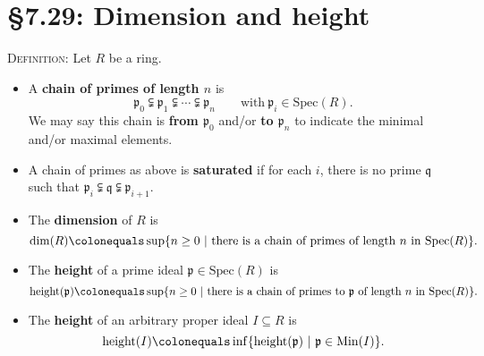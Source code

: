 \documentclass[12pt]{amsart}
\newcommand{\p}{\mathfrak{p}}
\newcommand{\q}{\mathfrak{q}}
\newcommand{\hgt}{\mathrm{height}}
\newcommand{\Min}{\mathrm{Min}}
\newcommand{\Spec}{\mathrm{Spec}}
\renewcommand{\1}{\mathbbm{1}}
\newcommand{\showsol}[1]{\def\displaysol{#1}}
\newcommand\ceq{\colonequals}
\begin{document}
\showsol{0}
	
	\thispagestyle{empty}
	
	\section*{\S7.29: Dimension and height}
	
	\begin{framed}

\noindent \textsc{Definition:} Let $R$ be a ring. 
\begin{itemize}
\item A \textbf{chain of primes of length $n$} is
\[ \p_0 \subsetneqq \p_1 \subsetneqq \cdots \subsetneqq \p_n \qquad \text{with} \ \p_i\in \Spec(R).\]
We may say this chain is \textbf{from $\p_0$} and/or \textbf{to $\p_n$} to indicate the minimal and/or maximal elements.
\item A chain of primes as above is \textbf{saturated} if for each $i$, there is no prime $\q$ such that ${\p_i \subsetneqq \q \subsetneqq \p_{i+1}}$.
\item The \textbf{dimension} of $R$ is 
\[ \dim(R) \ceq \sup\{ n\geq 0 \ | \ \text{there is a chain of primes of length $n$ in $\Spec(R)$}\}.\]
\item The \textbf{height} of a prime ideal $\p\in \Spec(R)$ is
\[ \hgt(\p)\ceq  \sup\{ n\geq 0 \ | \ \text{there is a chain of primes to $\p$ of length $n$ in $\Spec(R)$}\}.\]
\item The \textbf{height} of an arbitrary proper ideal $I\subseteq R$ is
\[ \hgt(I)\ceq  \inf\{ \hgt(\p) \ | \ \p\in \Min(I) \}.\]
\end{itemize}
\end{framed}
\end{document}
